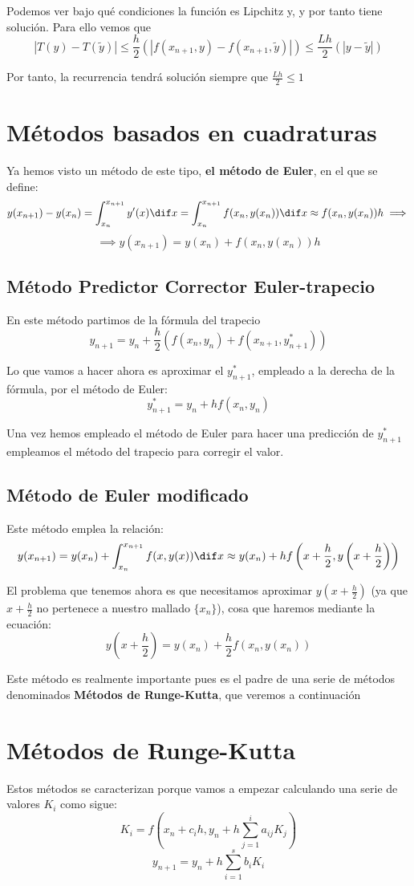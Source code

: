 Podemos ver bajo qué condiciones la función es Lipchitz y, y por tanto tiene solución. Para ello vemos que
\[|T(y) - T(\tilde{y})| \leq \frac{h}{2} \left( |f(x_{n+1}, y) - f(x_{n+1},\tilde{y})|\right) \leq \frac{Lh}{2}\left( |y-\tilde{y}|\right)\]

Por tanto, la recurrencia tendrá solución siempre que $\frac{Lh}{2} \leq 1$

\section{Métodos basados en cuadraturas}
Ya hemos visto un método de este tipo, \textbf{el método de Euler}, en el que se define:
\[y(x_{n+1}) -y(x_n) = \int_{x_n}^{x_{n+1}} y'(x)\dif x = \int_{x_n}^{x_{n+1}} f(x_n,y(x_n)) \dif x \approx f(x_n,y(x_n))h \implies \]
\[\implies y(x_{n+1}) =y(x_n)+f(x_n,y(x_n))h\]

\subsection{Método Predictor Corrector Euler-trapecio}
En este método partimos de la fórmula del trapecio
\[y_{n+1} = y_n + \frac{h}{2} \left(f(x_n,y_n)+f(x_{n+1}, y^*_{n+1}) \right)\]

Lo que vamos a hacer ahora es aproximar el $y^*_{n+1}$, empleado a la derecha de la fórmula, por el método de Euler:
\[y^*_{n+1} = y_n + h f(x_n,y_n)\]

Una vez hemos empleado el método de Euler para hacer una predicción de $y^*_{n+1}$ empleamos el método del trapecio para corregir el valor.

\subsection{Método de Euler modificado}
Este método emplea la relación:
\[y(x_{n+1}) = y(x_n) + \int_{x_n}^{x_{n+1}} f(x,y(x))\dif x \approx y(x_n) + h f\left(x+\frac{h}{2},y\left(x+\frac{h}{2}\right)\right)\]


El problema que tenemos ahora es que necesitamos aproximar $y(x+\frac{h}{2})$ (ya que $x+\frac{h}{2}$ no pertenece a nuestro mallado $\{x_n\}$), cosa que haremos mediante la ecuación:
\[y\left(x+\frac{h}{2}\right) = y(x_n)+\frac{h}{2}f(x_n, y(x_n))\]

Este método es realmente importante pues es el padre de una serie de métodos denominados \textbf{Métodos de Runge-Kutta}, que veremos a continuación

\section{Métodos de Runge-Kutta}
Estos métodos se caracterizan porque vamos a empezar calculando una serie de valores $K_i$ como sigue:
\[K_i = f\left(x_n+c_ih, y_n+h \sum_{j=1}^ia_{ij}K_j\right)\]
\[y_{n+1} = y_n+ h \sum_{i=1}^s b_i K_i\]

